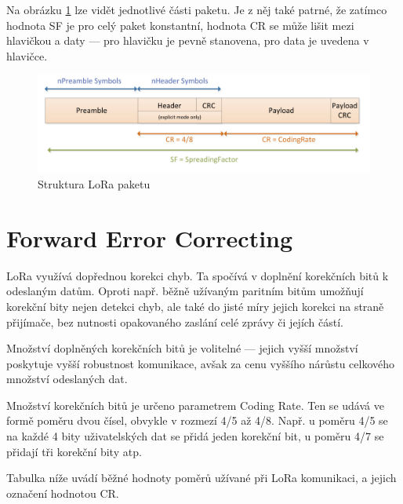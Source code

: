     Na obrázku \ref{fig:LoRa_packet_structure} lze vidět jednotlivé části
    paketu. Je z něj také patrné, že zatímco hodnota SF je pro celý paket 
    konstantní, hodnota CR se může lišit mezi hlavičkou a daty --- pro hlavičku je
    pevně stanovena, pro data je uvedena v hlavičce.

    \begin{figure}[h]
        \begin{centering}
            \includegraphics[width=1\textwidth]{Figures/lora_packet_structure}
            \caption{Struktura LoRa paketu}
            \label{fig:LoRa_packet_structure}
        \end{centering}
    \end{figure}


\section{Forward Error Correcting}\label{sec:FEC}

    LoRa využívá dopřednou korekci chyb. Ta spočívá v doplnění korekčních bitů
    k odeslaným datům. Oproti např. běžně užívaným paritním bitům umožňují
    korekční bity nejen detekci chyb, ale také do jisté míry jejich korekci na
    straně přijímače, bez nutnosti opakovaného zaslání celé zprávy či jejích
    částí.

    Množství doplněných korekčních bitů je volitelné --- jejich vyšší množství
    poskytuje vyšší robustnost komunikace, avšak za cenu vyššího nárůstu
    celkového množství odeslaných dat.

    Množství korekčních bitů je určeno parametrem Coding Rate. Ten se udává ve 
    formě poměru dvou čísel, obvykle v rozmezí 4/5 až 4/8. Např. u poměru 4/5 
    se na každé 4 bity uživatelských dat se přidá jeden korekční bit, u poměru
    4/7 se přidají tři korekční bity atp.

    Tabulka níže uvádí běžné hodnoty poměrů užívané při LoRa komunikaci, a 
    jejich označení hodnotou CR.

